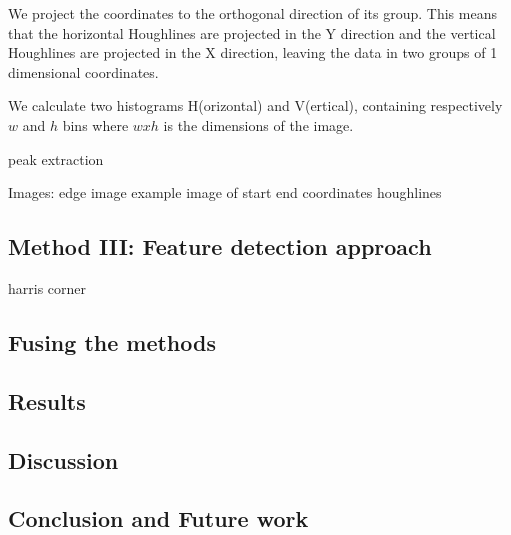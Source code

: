 We project the coordinates to the orthogonal direction of its group. This means
that the horizontal Houghlines are projected in the Y direction and the vertical
Houghlines are projected in the X direction, leaving the data in two groups of 1
dimensional coordinates.

We calculate two histograms H(orizontal) and V(ertical), containing respectively $w$
and $h$ bins where $w x h$ is the dimensions of the image.

peak extraction


Images:
edge image
example image of start end coordinates houghlines



\subsection{Method III: Feature detection approach}
	harris corner

\subsection{Fusing the methods}

\subsection{Results}
\subsection{Discussion}  %
\subsection{Conclusion and Future work}




% 
% 
% 
% 
% 
% 
% 
% 

